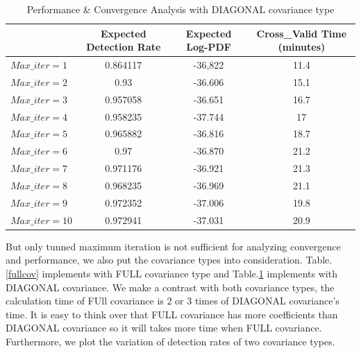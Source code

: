\documentclass[12pt,DIV14,BCOR12mm,a4paper,footinclude=false,headinclude,parskip=half-,twoside,openright,cleardoublepage=empty,toc=index,bibliography=totoc,listof=totoc]{scrreprt}
\numberwithin{equation}{chapter}
\begin{document}
\begin{table}
	\centering
	\caption{Performance \& Convergence Analysis with DIAGONAL covariance type}
	\label{diagcov}
	\begin{tabular}{lccc}
		\toprule
		& Expected Detection Rate & Expected Log-PDF & Cross\_Valid Time (minutes) \\
		\midrule
		$Max\_iter=1$ & 0.864117 & -36,822 &  11.4 \\
		$Max\_iter=2$ & 0.93 & -36.606 &  15.1 \\
		$Max\_iter=3$ & 0.957058 & -36.651 &  16.7 \\
		$Max\_iter=4$ & 0.958235 & -37.744 &  17 \\
		$Max\_iter=5$ & 0.965882 & -36.816 &  18.7 \\
		$Max\_iter=6$ & 0.97 & -36.870 &  21.2 \\
		$Max\_iter=7$ & 0.971176 & -36.921 &  21.3 \\
		$Max\_iter=8$ & 0.968235 & -36.969 &  21.1 \\
		$Max\_iter=9$ & 0.972352 & -37.006 &  19.8 \\
		$Max\_iter=10$ & 0.972941 & -37.031 &  20.9 \\
		\bottomrule
	\end{tabular}
\end{table}

But only tunned maximum iteration is not sufficient for analyzing convergence and performance, we also put the covariance types into consideration. Table.\ref{fullcov} implements with FULL covariance type and Table.\ref{diagcov} implements with DIAGONAL covariance. We make a contrast with both covariance types, the calculation time of FUll covariance is 2 or 3 times of DIAGONAL covariance's time. It is easy to think over that FULL covariance has more coefficients than DIAGONAL covariance so it will takes more time when FULL covariance. Furthermore, we plot the variation of detection rates of two covariance types. 
\end{document}
